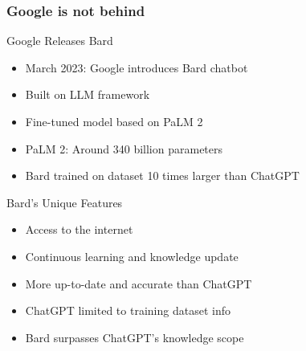 \begin{frame}[fragile]\frametitle{Google is not behind}
Google Releases Bard
    \begin{itemize}
        \item March 2023: Google introduces Bard chatbot
        \item Built on LLM framework
        \item Fine-tuned model based on PaLM 2
        \item PaLM 2: Around 340 billion parameters
        \item Bard trained on dataset 10 times larger than ChatGPT
    \end{itemize}
Bard's Unique Features
    \begin{itemize}
        \item Access to the internet
        \item Continuous learning and knowledge update
        \item More up-to-date and accurate than ChatGPT
        \item ChatGPT limited to training dataset info
        \item Bard surpasses ChatGPT's knowledge scope
    \end{itemize}
\end{frame}







